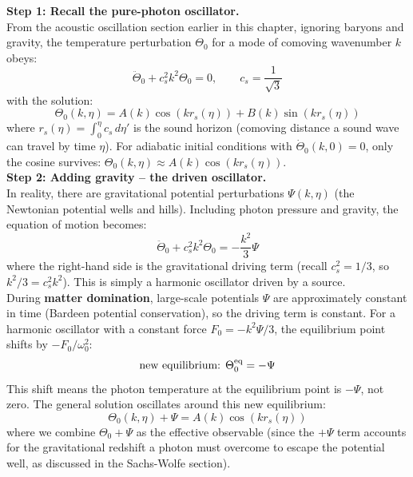 \bigskip \noindent
\begin{foundation}
    \textbf{Step 1: Recall the pure-photon oscillator.} \\
    From the acoustic oscillation section earlier in this chapter, ignoring baryons and gravity, the temperature perturbation $\Theta_0$ for a mode of comoving wavenumber $k$ obeys:
    \[
        \ddot{\Theta}_0 + c_s^2 k^2 \Theta_0 = 0, \qquad c_s = \frac{1}{\sqrt{3}}
    \]
    with the solution:
    \[
        \Theta_0(k, \eta) = A(k)\cos(k r_s(\eta)) + B(k)\sin(k r_s(\eta))
    \]
    where $r_s(\eta) = \int_0^\eta c_s\, d\eta'$ is the sound horizon (comoving distance a sound wave can travel by time $\eta$). For adiabatic initial conditions with $\dot{\Theta}_0(k,0) = 0$, only the cosine survives: $\Theta_0(k,\eta) \approx A(k)\cos(k r_s(\eta))$. \\

    \textbf{Step 2: Adding gravity -- the driven oscillator.} \\
    In reality, there are gravitational potential perturbations $\Psi(k,\eta)$ (the Newtonian potential wells and hills). Including photon pressure and gravity, the equation of motion becomes:
    \[
        \ddot{\Theta}_0 + c_s^2 k^2 \Theta_0 = - \frac{k^2}{3} \Psi
    \]
    where the right-hand side is the gravitational driving term (recall $c_s^2 = 1/3$, so $k^2/3 = c_s^2 k^2$). This is simply a harmonic oscillator driven by a source. \\

    During \textbf{matter domination}, large-scale potentials $\Psi$ are approximately constant in time (Bardeen potential conservation), so the driving term is constant. For a harmonic oscillator with a constant force $F_0 = -k^2\Psi/3$, the equilibrium point shifts by $-F_0/\omega_0^2$:
    \[
        \text{new equilibrium: } \Theta_0^{\rm eq} = -\Psi
    \]
    This shift means the photon temperature at the equilibrium point is $-\Psi$, not zero. The general solution oscillates around this new equilibrium:
    \[
        \Theta_0(k,\eta) + \Psi = A(k)\cos(k r_s(\eta))
    \]
    where we combine $\Theta_0 + \Psi$ as the effective observable (since the $+\Psi$ term accounts for the gravitational redshift a photon must overcome to escape the potential well, as discussed in the Sachs-Wolfe section). \\


\end{foundation}
